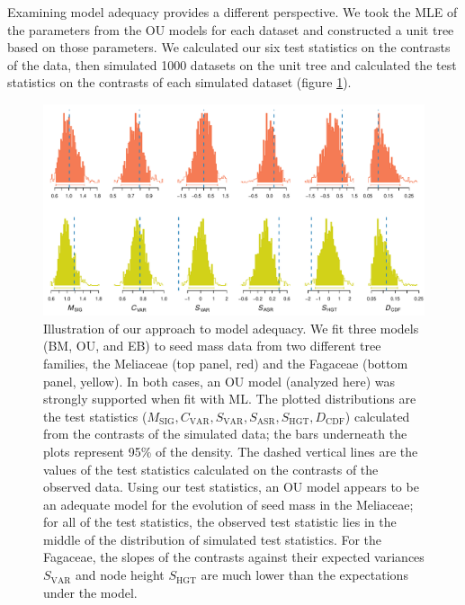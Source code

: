 Examining model adequacy provides a different perspective. We took the MLE of the parameters from the OU models for each dataset and constructed a unit tree based on those parameters. We calculated our six test statistics on the contrasts of the data, then simulated 1000 datasets on the unit tree and calculated the test statistics on the contrasts of each simulated dataset (figure \ref{fig:two-clades}). 

\begin{figure}[p]
  \centering
  \includegraphics[width=\textwidth]{figs/two-clades}
  \caption[Seed mass evolution in Meliaceae and Fagaceae]{Illustration of our approach to model adequacy. We fit three models (BM, OU, and EB) to seed mass data from two different tree families, the Meliaceae (top panel, red) and the Fagaceae (bottom panel, yellow). In both cases, an OU model (analyzed here) was strongly supported when fit with ML. The plotted distributions are the test statistics ($M_{\text{SIG}}, C_{\text{VAR}}, S_{\text{VAR}}, S_{\text{ASR}}, S_{\text{HGT}}, D_{\text{CDF}}$) calculated from the contrasts of the simulated data; the bars underneath the plots represent 95\% of the density. The dashed vertical lines are the values of the test statistics calculated on the contrasts of the observed data. Using our test statistics, an OU model appears to be an adequate model for the evolution of seed mass in the Meliaceae; for all of the test statistics, the observed test statistic lies in the middle of the distribution of simulated test statistics. For the Fagaceae, the slopes of the contrasts against their expected variances $S_{\text{VAR}}$ and node height $S_{\text{HGT}}$ are much lower than the expectations under the model.}
  \label{fig:two-clades}
\end{figure}

